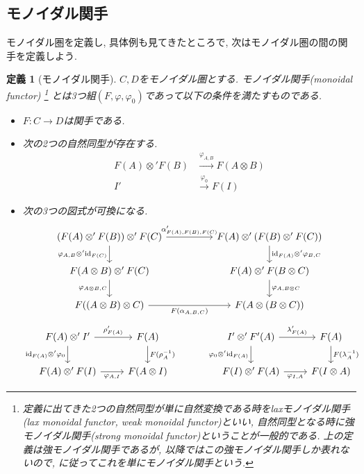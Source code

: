 \documentclass[a4paper,12pt]{ltjsarticle}
\theoremstyle{break}
\newtheorem{defn}[thm]{定義}
\newcommand{\xr}[1]{\xrightarrow{#1}}
\newcommand{\id}{\mathrm{id}}
\newcommand{\al}{\alpha}
\newcommand{\la}{\lambda}
\newcommand{\vp}{\varphi}
\newcommand{\ot}{\otimes}
\numberwithin{equation}{section}
\begin{document}
\subsection{モノイダル関手}

モノイダル圏を定義し, 具体例も見てきたところで, 次はモノイダル圏の間の関手を定義しよう. 

\begin{defn}[モノイダル関手]
  $C,D$をモノイダル圏とする. 
  モノイダル関手(monoidal functor)
  \footnote{
    定義に出てきた2つの自然同型が単に自然変換である時をlaxモノイダル関手(lax monoidal functor, weak monoidal functor)といい, 
    自然同型となる時に強モノイダル関手(strong monoidal functor)ということが一般的である.
    上の定義は強モノイダル関手であるが, 以降ではこの強モノイダル関手しか表れないので, \cite{cfqt}に従ってこれを単にモノイダル関手という. 
  }
  とは3つ組$(F,\vp,\vp_0)$であって以下の条件を満たすものである. 
  \begin{itemize}
    \item $F: C \to D$は関手である. 
    \item 次の2つの自然同型が存在する. 
      \begin{align*}
        F(A) \ot' F(B) &\xr{\vp_{A,B}} F(A \ot B) \\
        I' &\xr{\vp_0} F(I)
      \end{align*}  
    \item 次の3つの図式が可換になる. 
    \[\begin{tikzcd}
      {(F(A) \ot' F(B)) \ot' F(C)} && {F(A) \ot' (F(B) \ot' F(C))} \\
      {F(A \ot B) \ot' F(C)} && {F(A) \ot' F(B \ot C)} \\
      {F((A \ot B) \ot C)} && {F(A \ot (B \ot C))}
      \arrow["{\al'_{F(A),F(B),F(C)}}", from=1-1, to=1-3]
      \arrow["{\vp_{A,B} \ot' \id_{F(C)}}"', from=1-1, to=2-1]
      \arrow["{\vp_{A \ot B,C}}"', from=2-1, to=3-1]
      \arrow["{\id_{F(A)} \ot' \vp_{B,C}}", from=1-3, to=2-3]
      \arrow["{\vp_{A,B \ot C}}", from=2-3, to=3-3]
      \arrow["{F(\al_{A,B,C})}"', from=3-1, to=3-3]
    \end{tikzcd}\]
    \[\begin{tikzcd}
      {F(A) \ot' I'} & {F(A)} && {I' \ot' F'(A)} & {F(A)} \\
      {F(A) \ot' F(I)} & {F(A \ot I)} && {F(I) \ot' F(A)} & {F(I \ot A)}
      \arrow["{\rho'_{F(A)}}", from=1-1, to=1-2]
      \arrow["{\id_{F(A)} \ot' \vp_0}"', from=1-1, to=2-1]
      \arrow["{\vp_{A,I}}"', from=2-1, to=2-2]
      \arrow["{F(\rho_A^{-1})}", from=1-2, to=2-2]
      \arrow["{\la'_{F(A)}}", from=1-4, to=1-5]
      \arrow["{\vp_0 \ot' \id_{F(A)}}"', from=1-4, to=2-4]
      \arrow["{F(\la_A^{-1})}", from=1-5, to=2-5]
      \arrow["{\vp_{I,A}}"', from=2-4, to=2-5]
    \end{tikzcd}\]
  \end{itemize}  
\end{defn}
\end{document}
